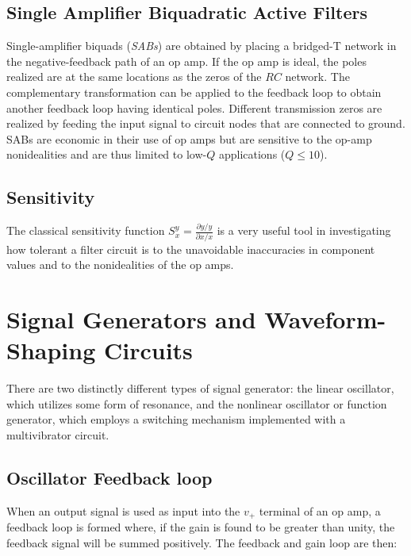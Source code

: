 \documentclass[11pt]{article}
\begin{document}
    \subsection{Single Amplifier Biquadratic Active Filters}

    Single-amplifier biquads (\textit{SABs}) are obtained by placing a bridged-T network in the negative-feedback path of an op amp. If the op amp is ideal, the poles realized are at the same locations as the zeros of the $RC$ network. The complementary transformation can be applied to the feedback loop to obtain another feedback loop having identical poles. Different transmission zeros are realized by feeding the input signal to circuit nodes that are connected to ground. SABs are economic in their use of op amps but are sensitive to the op-amp nonidealities and
    are thus limited to low-$Q$ applications ($Q \leq 10$).

    \subsection{Sensitivity}

    The classical sensitivity function
    $S^{y}_x = \frac{\partial{y}/y}{\partial{x}/x}$
    is a very useful tool in investigating how tolerant a filter circuit is to the unavoidable inaccuracies in component values and to the nonidealities of the op amps.


    \section{Signal Generators and Waveform-Shaping Circuits}

    There are two distinctly different types of signal generator: the linear oscillator, which utilizes some form of resonance, and the nonlinear oscillator or function generator, which employs a switching mechanism implemented with a multivibrator circuit.

    \subsection{Oscillator Feedback loop}

    When an output signal is used as input into the $v_+$ terminal of an op amp, a feedback loop is formed where, if the gain is found to be greater than unity, the feedback signal will be summed positively. The feedback and gain loop are then:
    
\end{document}
